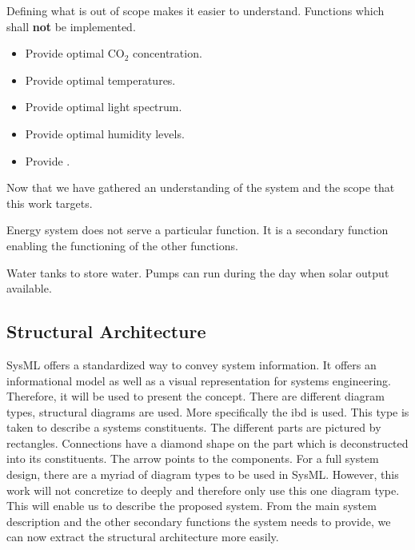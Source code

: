 Defining what is out of scope makes it easier to understand.
Functions which shall \textbf{not} be implemented.
\begin{itemize}
	\item Provide optimal CO$_2$ concentration.
	\item Provide optimal temperatures.
	\item Provide optimal light spectrum.
	\item Provide optimal humidity levels.
	\item Provide .

\end{itemize}

Now that we have gathered an understanding of the system and the scope that this work targets.

Energy system does not serve a particular function.
It is a secondary function enabling the functioning of the other functions.

Water tanks to store water.
Pumps can run during the day when solar output available.

\subsection{Structural Architecture}
\label{sub:stru-arch}
SysML offers a standardized way to convey system information.
It offers an informational model as well as a visual representation for systems engineering.
Therefore, it will be used to present the concept.
There are different diagram types, structural diagrams are used.
More specifically the \ac{ibd} is used.
This type is taken to describe a systems constituents.
The different parts are pictured by rectangles.
Connections have a diamond shape on the part which is deconstructed into its constituents.
The arrow points to the components.
For a full system design, there are a myriad of diagram types to be used in SysML.
However, this work will not concretize to deeply and therefore only use this one diagram type.
This will enable us to describe the proposed system.
From the main system description and the other secondary functions the system needs to provide, we can now extract the structural architecture more easily.

